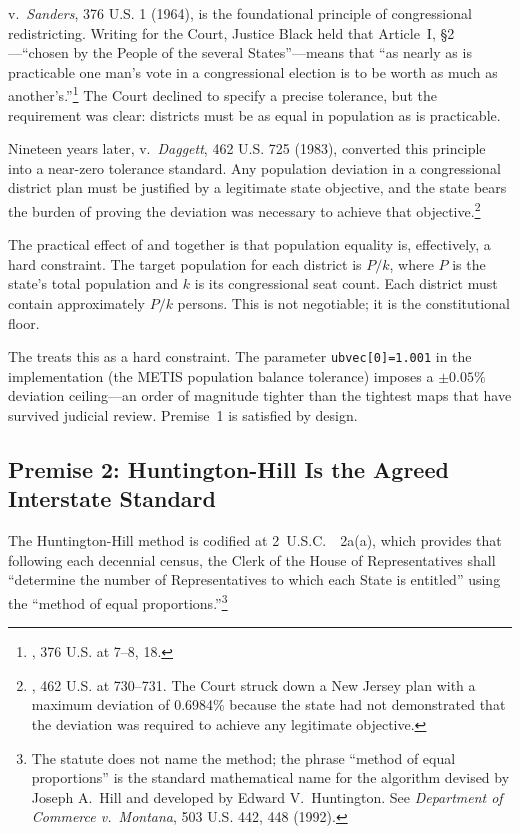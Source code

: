 \wesberry{} v.\ \textit{Sanders}, 376 U.S. 1 (1964), is the foundational
principle of congressional redistricting.
Writing for the Court, Justice Black held that Article~I, \S2---``chosen by
the People of the several States''---means that ``as nearly as is practicable
one man's vote in a congressional election is to be worth as much as
another's.''\footnote{%
  \wesberry{}, 376 U.S. at 7--8, 18.
}
The Court declined to specify a precise tolerance, but the requirement was
clear: districts must be as equal in population as is practicable.

Nineteen years later, \karcher{} v.\ \textit{Daggett}, 462 U.S. 725 (1983),
converted this principle into a near-zero tolerance standard.
Any population deviation in a congressional district plan must be justified
by a legitimate state objective, and the state bears the burden of proving
the deviation was necessary to achieve that objective.\footnote{%
  \karcher{}, 462 U.S. at 730--731.
  The Court struck down a New Jersey plan with a maximum deviation of 0.6984\%
  because the state had not demonstrated that the deviation was required to
  achieve any legitimate objective.
}

The practical effect of \wesberry{} and \karcher{} together is that population
equality is, effectively, a hard constraint.
The target population for each district is $P/k$, where $P$ is the state's
total population and $k$ is its congressional seat count.
Each district must contain approximately $P/k$ persons.
This is not negotiable; it is the constitutional floor.

The \dia{} treats this as a hard constraint.
The parameter \texttt{ubvec[0]=1.001} in the \ar{} implementation
(the METIS population balance tolerance) imposes a $\pm 0.05\%$ deviation
ceiling---an order of magnitude tighter than the tightest maps that have
survived judicial review.
Premise~1 is satisfied by design.

\subsection{Premise 2: Huntington-Hill Is the Agreed Interstate Standard}

The Huntington-Hill method is codified at 2~U.S.C.~\usca{}~2a(a), which
provides that following each decennial census, the Clerk of the House of
Representatives shall ``determine the number of Representatives to which each
State is entitled'' using the ``method of equal proportions.''\footnote{%
  The statute does not name the method; the phrase ``method of equal
  proportions'' is the standard mathematical name for the algorithm
  devised by Joseph A.\ Hill and developed by Edward V.\ Huntington.
  See \textit{Department of Commerce v.\ Montana}, 503 U.S. 442, 448 (1992).
}

